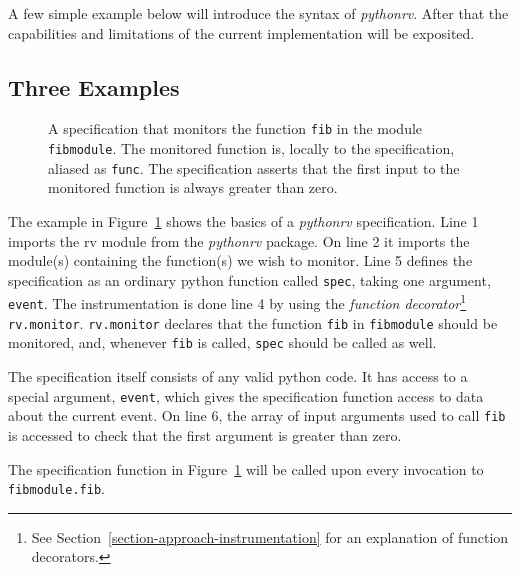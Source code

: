 \documentclass[a4paper,11pt]{kth-mag}
\begin{document}
A few simple example below will introduce the syntax of \textit{pythonrv}.
After that the capabilities and limitations of the current implementation will
be exposited.

\subsection{Three Examples}
\lstset{language=Python,numbers=left}

\begin{figure}[h!]
	\begin{center}
	\begin{minipage}{0.7\textwidth}
	
	\end{minipage}
	\end{center}

	\caption{A specification that monitors the function \texttt{fib} in the
		module \texttt{fibmodule}. The monitored function is, locally to the
		specification, aliased as \texttt{func}. The specification asserts that the
		first input to the monitored function is always greater than zero.}
	\label{figure-syntax-example-1}
\end{figure}

The example in Figure~\ref{figure-syntax-example-1} shows the basics of a
\textit{pythonrv} specification. Line 1 imports the rv module from the
\textit{pythonrv} package.  On line 2 it imports the module(s) containing the
function(s) we wish to monitor. Line 5 defines the specification as an ordinary
python function called \texttt{spec}, taking one argument, \texttt{event}. The
instrumentation is done line 4 by using the \textit{function
decorator}\footnote{See Section~\ref{section-approach-instrumentation} for an
explanation of function decorators.} \texttt{rv.monitor}. \texttt{rv.monitor}
declares that the function \texttt{fib} in \texttt{fibmodule} should be
monitored, and, whenever \texttt{fib} is called, \texttt{spec} should be called
as well.

The specification itself consists of any valid python code. It has access to a
special argument, \texttt{event}, which gives the specification function access
to data about the current event. On line 6, the array of input arguments used
to call \texttt{fib} is accessed to check that the first argument is greater
than zero.

The specification function in Figure~\ref{figure-syntax-example-1} will be
called upon every invocation to \texttt{fibmodule.fib}.
\end{document}
